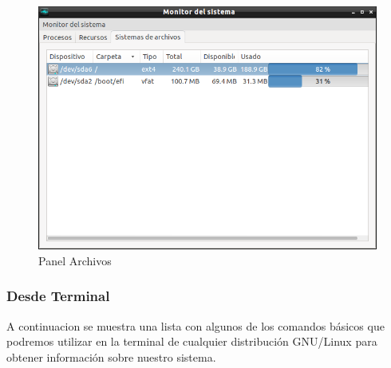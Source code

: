 \documentclass[a4paper,11pt]{article}
\begin{document}
\begin{figure}[H]
  \centering
  \includegraphics[width=1\textwidth]{08linuxMonitorSistemaArchivos}
  \caption{Panel Archivos}
  \label{fig:linuxMonitorSistemaArchivos}
\end{figure}

\subsubsection{Desde Terminal}

 \cite{ref:web6} A continuacion se muestra una lista con algunos de los comandos básicos que podremos utilizar en la terminal de cualquier distribución GNU/Linux para obtener información sobre nuestro sistema.
\end{document}
